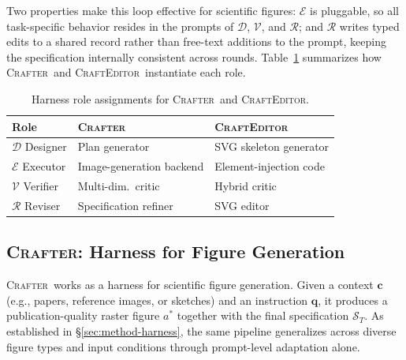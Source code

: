 \documentclass{llmxive}
\providecommand{\Crafter}{\textsc{Crafter}\xspace}
\providecommand{\Editor}{\textsc{CraftEditor}\xspace}
\begin{document}
Two properties make this loop effective for scientific figures:
$\mathcal{E}$ is pluggable, so all task-specific behavior resides in the
prompts of $\mathcal{D}$, $\mathcal{V}$, and $\mathcal{R}$; and
$\mathcal{R}$ writes typed edits to a shared record rather than
free-text additions to the prompt, keeping the specification internally
consistent across rounds. Table~\ref{tab:harness-roles} summarizes how
\Crafter\ and \Editor\ instantiate each role.

\begin{table}[t]
\centering
\small
\begin{tabular}{@{}lll@{}}
\toprule
Role & \Crafter & \Editor \\
\midrule
$\mathcal{D}$ Designer  & Plan generator        & SVG skeleton generator \\
$\mathcal{E}$ Executor  & Image-generation backend & Element-injection code \\
$\mathcal{V}$ Verifier  & Multi-dim.\ critic    & Hybrid critic \\
$\mathcal{R}$ Reviser   & Specification refiner & SVG editor \\
\bottomrule
\end{tabular}
\caption{Harness role assignments for \Crafter\ and \Editor.}
\label{tab:harness-roles}
\end{table}

\subsection{\Crafter: Harness for Figure Generation}
\label{sec:method-crafter}


\Crafter\ works as a harness for scientific figure generation. Given a context $\mathbf{c}$ (e.g., papers, reference images, or sketches) and an instruction $\mathbf{q}$, it produces a publication-quality raster figure $a^*$ together with the final specification $\mathcal{S}_T$. 
As established in \S\ref{sec:method-harness}, the same pipeline
generalizes across diverse figure types and input conditions through
prompt-level adaptation alone.
\end{document}

